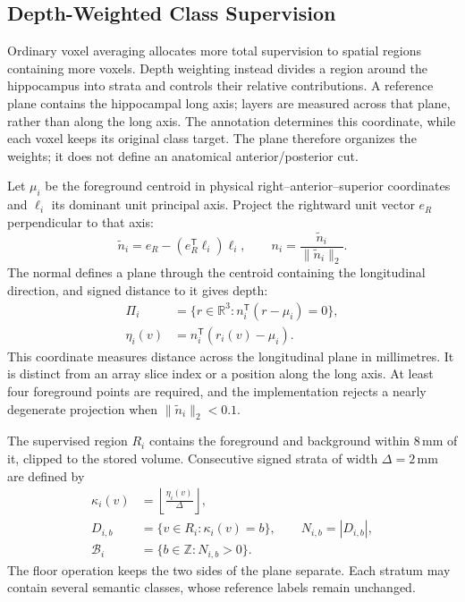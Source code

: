 \documentclass[12pt,a4paper]{article}
\begin{document}
\subsection{Depth-Weighted Class Supervision}\label{sec:depth-constraints}

Ordinary voxel averaging allocates more total supervision to spatial
regions containing more voxels. Depth weighting instead divides a
region around the hippocampus into strata and controls their relative
contributions. A reference plane contains the hippocampal long axis;
layers are measured across that plane, rather than along the long axis.
The annotation determines this coordinate, while each voxel keeps its
original class target. The plane therefore organizes the weights; it
does not define an anatomical anterior/posterior cut.

Let $\mu_i$ be the foreground centroid in physical
right--anterior--superior coordinates and $\ell_i$ its dominant unit
principal axis. Project the rightward unit vector $e_R$ perpendicular
to that axis:
\begin{equation}
\widetilde n_i=e_R-(e_R^{\mathsf T}\ell_i)\ell_i,
\qquad
n_i=\frac{\widetilde n_i}{\|\widetilde n_i\|_2}.
\label{eq:depth-plane-normal}
\end{equation}
The normal defines a plane through the centroid containing the
longitudinal direction, and signed distance to it gives depth:
\begin{equation}
\begin{aligned}
\Pi_i&=\{r\in\mathbb{R}^{3}:n_i^{\mathsf T}(r-\mu_i)=0\},\\
\eta_i(v)&=n_i^{\mathsf T}(r_i(v)-\mu_i).
\end{aligned}
\label{eq:depth-plane-coordinate}
\end{equation}
This coordinate measures distance across the longitudinal plane in
millimetres. It is distinct from an array slice index or a position
along the long axis. At least four foreground points are required,
and the implementation rejects a nearly degenerate projection when
$\|\widetilde n_i\|_2<0.1$.

The supervised region $R_i$ contains the foreground and background
within $8\,\mathrm{mm}$ of it, clipped to the stored volume. Consecutive
signed strata of width $\Delta=2\,\mathrm{mm}$ are defined by
\begin{equation}
\begin{aligned}
\kappa_i(v)&=\left\lfloor\frac{\eta_i(v)}{\Delta}\right\rfloor,\\
D_{i,b}&=\{v\in R_i:\kappa_i(v)=b\},
\qquad N_{i,b}=|D_{i,b}|,\\
\mathcal{B}_i&=\{b\in\mathbb{Z}:N_{i,b}>0\}.
\end{aligned}
\label{eq:depth-strata}
\end{equation}
The floor operation keeps the two sides of the plane separate.
Each stratum may contain several semantic classes, whose reference
labels remain unchanged.
\end{document}

